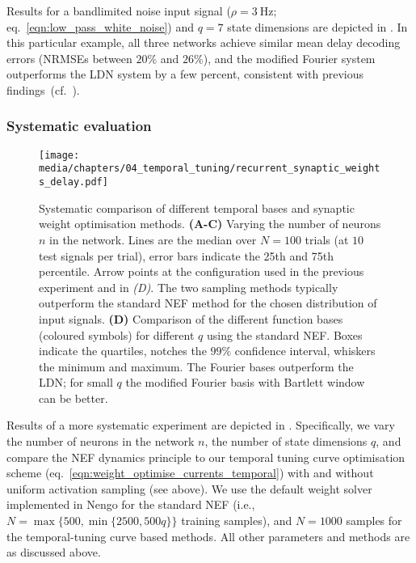 Results for a bandlimited noise input signal ($\rho = \SI{3}{\hertz}$; eq.~\ref{eqn:low_pass_white_noise}) and $q = 7$ state dimensions are depicted in .
In this particular example, all three networks achieve similar mean delay decoding errors (NRMSEs between $20\%$ and $26\%$), and the modified Fourier system outperforms the LDN system by a few percent, consistent with previous findings~(cf.~).

\subsubsection{Systematic evaluation}

\begin{figure}[p]
	\centering
	\texttt{[image: media/chapters/04\_temporal\_tuning/recurrent\_synaptic\_weights\_delay.pdf]}
	\caption[Systematic comparison of different temporal bases and synaptic weight optimisation methods]{
	Systematic comparison of different temporal bases and synaptic weight optimisation methods.
	\textbf{(A-C)} Varying the number of neurons $n$ in the network. Lines are the median over $N = 100$ trials (at $10$ test signals per trial), error bars indicate the 25th and 75th percentile. Arrow points at the configuration used in the previous experiment and in \emph{(D)}. The two sampling methods typically outperform the standard NEF method for the chosen distribution of input signals.
	\textbf{(D)} Comparison of the different function bases (coloured symbols) for different $q$ using the standard NEF.
	Boxes indicate the quartiles, notches the $99\%$ confidence interval, whiskers the minimum and maximum.
	The Fourier bases outperform the LDN; for small $q$ the modified Fourier basis with Bartlett window can be better.
	}
	\label{fig:recurrent_synaptic_weights_delay}
\end{figure}

Results of a more systematic experiment are depicted in .
Specifically, we vary the number of neurons in the network $n$, the number of state dimensions $q$, and compare the NEF dynamics principle to our temporal tuning curve optimisation scheme (eq.~\ref{eqn:weight_optimise_currents_temporal}) with and without uniform activation sampling (see above).
We use the default weight solver implemented in Nengo for the standard NEF (i.e., $N = \max\{500, \min\{2500, 500 q\}\}$ training samples), and $N = 1000$ samples for the temporal-tuning curve based methods.
All other parameters and methods are as discussed above.

